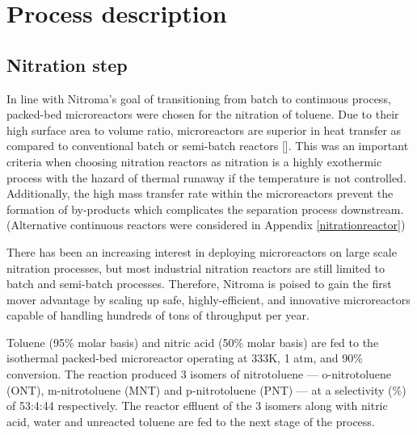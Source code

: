 \section{Process description}
\label{sec:process}
\subsection{Nitration step}
In line with Nitroma's goal of transitioning from batch to continuous process, packed-bed microreactors were chosen for the nitration of toluene. Due to their high surface area to volume ratio, microreactors are superior in heat transfer as compared to conventional batch or semi-batch reactors []. This was an important criteria when choosing nitration reactors as nitration is a highly exothermic process with the hazard of thermal runaway if the temperature is not controlled. Additionally, the high mass transfer rate within the microreactors prevent the formation of by-products which complicates the separation process downstream.
(Alternative continuous reactors were considered in Appendix \ref{nitrationreactor})

There has been an increasing interest in deploying microreactors on large scale nitration processes, but most industrial nitration reactors are still limited to batch and semi-batch processes. Therefore, Nitroma is poised to gain the first mover advantage by scaling up safe, highly-efficient, and innovative microreactors capable of handling hundreds of tons of throughput per year.

Toluene (95\% molar basis) and nitric acid (50\% molar basis) are fed to the isothermal packed-bed microreactor operating at 333K, 1 atm, and 90\% conversion. The reaction produced 3 isomers of nitrotoluene --- o-nitrotoluene (ONT), m-nitrotoluene (MNT) and p-nitrotoluene (PNT) --- at a selectivity (\%) of 53:4:44 respectively. The reactor effluent of the 3 isomers along with nitric acid, water and unreacted toluene are fed to the next stage of the process.

